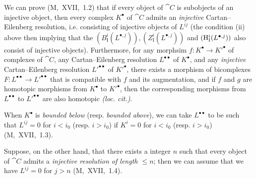 \begin{env}[11.4.2]
We can prove (M,~XVII,~1.2) that if every object of $\cat{C}$ is subobjects of an injective object, then every complex $K^\bullet$ of $\cat{C}$ admits an \emph{injective} Cartan--Eilenberg resolution, i.e. consisting of injective objects of $L^{ij}$ (the condition (ii) above then implying that the $(B_\mathrm{I}^i(L^{\bullet,j})), (Z_\mathrm{I}^i(L^{\bullet,j}))$ and $(\mathrm{H}_\mathrm{I}^i(L^{\bullet,j}))$ also consist of injective objects).
Furthermore, for any morphsim $f: K^\bullet \rightarrow K'^\bullet$ of complexes of $\cat{C}$, 
any Cartan--Eilenberg resolution $L^{\bullet\bullet}$ of $K^\bullet$, and any \emph{injective} Cartan--Eilenberg resolution $L'^{\bullet\bullet}$ of $K'^\bullet$, there exists a morphism of bicomplexes $F: L^{\bullet\bullet} \rightarrow L'^{\bullet\bullet}$ that is compatible with $f$ and its augmentation, and if $f$ and $g$ are homotopic morphisms from $K^\bullet$ to $K'^\bullet$, then the corresponding morphisms from $L^{\bullet\bullet}$ to $L'^{\bullet\bullet}$ are also homotopic \emph{(loc. cit.)}.

When $K^{\bullet}$ is \emph{bounded below} (resp. \emph{bounded above}), we can take $L^{\bullet\bullet}$ to be such that $L^{ij}=0$ for $i<i_0$ (resp. $i>i_0$) if $K^i=0$ for $i<i_0$ (resp. $i>i_0$) (M,~XVII,~1.3).

Suppose, on the other hand, that there exists a integer $n$ such that every object of $\cat{C}$ admits a \emph{injective resolution of length $\leq n$};
then we can assume that we have $L^{ij}=0$ for $j>n$ (M,~XVII,~1.4).
\end{env}


